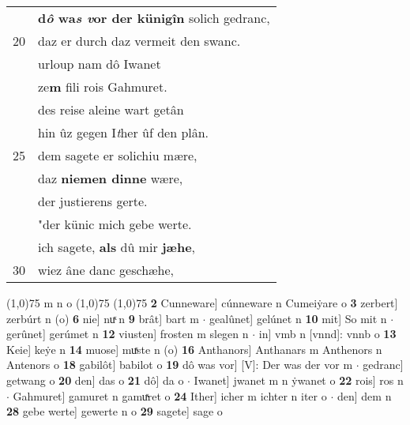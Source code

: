 \documentclass[8pt,a4paper,notitlepage]{article}
\begin{document}
\begin{table}[ht]
\begin{minipage}[t]{0.5\linewidth}
\begin{tabular}{rl}
 & \textbf{d\textit{ô} wa\textit{s v}or der künigîn} solich gedranc,\\ 
20 & daz er durch daz vermeit den swanc.\\ 
 & urloup nam dô Iwanet\\ 
 & ze\textbf{m} fili rois Gahmuret.\\ 
 & des reise aleine wart getân\\ 
 & hin ûz gegen I\textit{t}her ûf den plân.\\ 
25 & dem sagete er solichiu mære,\\ 
 & daz \textbf{niemen dinne} wære,\\ 
 & der justierens gerte.\\ 
 & "der künic mich gebe werte.\\ 
 & ich sagete, \textbf{als} dû mir \textbf{jæhe},\\ 
30 & wiez âne danc geschæhe,\\ 
\end{tabular}
\scriptsize
\line(1,0){75} \newline
m n o \newline
\line(1,0){75} \newline
\newline
\line(1,0){75} \newline
\textbf{2} Cunneware] cúnneware n Cumeiẏare o \textbf{3} zerbert] zerbúrt n (o) \textbf{6} nie] nuͯ n \textbf{9} brât] bart m  $\cdot$ gealûnet] gelúnet n \textbf{10} mit] So mit n  $\cdot$ gerûnet] gerúmet n \textbf{12} viusten] frosten m slegen n  $\cdot$ in] vmb n [vnnd]: vnnb o \textbf{13} Keie] keẏe n \textbf{14} muose] muͯste n (o) \textbf{16} Anthanors] Anthanars m Anthenors n Antenors o \textbf{18} gabilôt] babilot o \textbf{19} dô was vor] [V]: Der was der vor m  $\cdot$ gedranc] getwang o \textbf{20} den] das o \textbf{21} dô] da o  $\cdot$ Iwanet] jwanet m n ẏwanet o \textbf{22} rois] ros n  $\cdot$ Gahmuret] gamuret n gamuͯret o \textbf{24} Ither] icher m ichter n iter o  $\cdot$ den] dem n \textbf{28} gebe werte] gewerte n o \textbf{29} sagete] sage o \newline
\end{minipage}
\end{table}
\newpage
\end{document}
